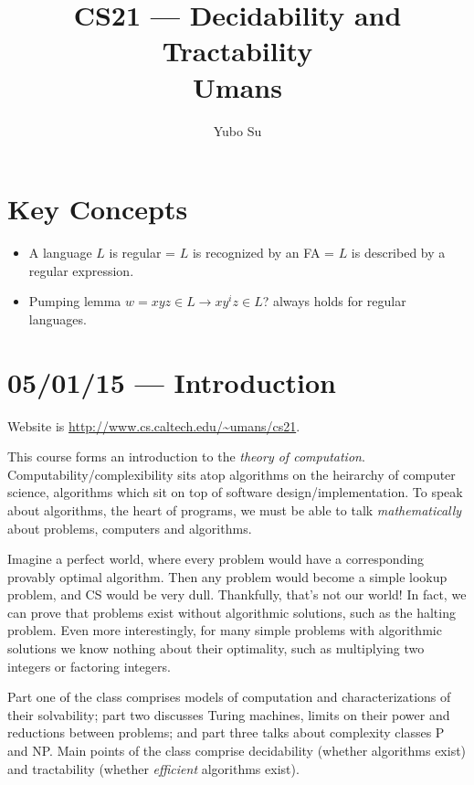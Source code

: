 \documentclass[10pt]{report}
\begin{document}
\title{CS21 --- Decidability and Tractability\\ Umans}
\author{Yubo Su}
\date{}

\maketitle
\tableofcontents

\chapter{Key Concepts}

\begin{itemize}
    \item A language $L$ is regular = $L$ is recognized by an FA = $L$ is described by a regular expression.
    \item Pumping lemma $w = xyz \in L \to xy^iz\in L$? always holds for regular languages.
\end{itemize}
\chapter{05/01/15 --- Introduction}

Website is \url{http://www.cs.caltech.edu/~umans/cs21}.

This course forms an introduction to the \emph{theory of computation}. Computability/complexibility sits atop algorithms on the heirarchy of computer science, algorithms which sit on top of software design/implementation. To speak about algorithms, the heart of programs, we must be able to talk \emph{mathematically} about problems, computers and algorithms. 

Imagine a perfect world, where every problem would have a corresponding provably optimal algorithm. Then any problem would become a simple lookup problem, and CS would be very dull. Thankfully, that's not our world! In fact, we can prove that problems exist without algorithmic solutions, such as the halting problem. Even more interestingly, for many simple problems with algorithmic solutions we know nothing about their optimality, such as multiplying two integers or factoring integers.

Part one of the class comprises models of computation and characterizations of their solvability; part two discusses Turing machines, limits on their power and reductions between problems; and part three talks about complexity classes P and NP. Main points of the class comprise decidability (whether algorithms exist) and tractability (whether \emph{efficient} algorithms exist).
\end{document}
